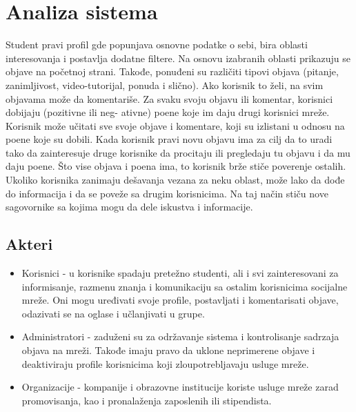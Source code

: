 \section{Analiza sistema}

Student pravi profil gde popunjava osnovne podatke o sebi, bira oblasti interesovanja i postavlja dodatne filtere. Na osnovu izabranih oblasti prikazuju se objave na početnoj strani. Takođe, ponuđeni
su različiti tipovi objava (pitanje, zanimljivost, video-tutorijal, ponuda i slično).
Ako korisnik to želi, na svim objavama može da komentariše.
Za svaku svoju objavu ili komentar, korisnici dobijaju (pozitivne ili neg-
ativne) poene koje im daju drugi korisnici mreže. Korisnik može
učitati sve svoje objave i komentare, koji su izlistani u odnosu na poene koje
su dobili. Kada korisnik pravi novu objavu ima za cilj da to uradi tako da
zainteresuje druge korisnike da procitaju ili pregledaju tu objavu i da mu
daju poene. Što vise objava i poena ima, to korisnik brže stiče poverenje
ostalih.
Ukoliko korisnika zanimaju dešavanja vezana za neku oblast, može lako da dođe do informacija i da se poveže sa drugim korisnicima. Na taj način stiču nove sagovornike sa kojima mogu da dele iskustva i informacije.

\subsection{Akteri}
\begin{itemize}
    \item Korisnici - u korisnike spadaju pretežno studenti, ali i svi zainteresovani za informisanje, razmenu znanja i komunikaciju sa ostalim korisnicima socijalne mreže. Oni mogu uređivati svoje profile, postavljati i komentarisati objave, odazivati se na oglase i učlanjivati u grupe.
    \item Administratori - zaduženi su za održavanje sistema i kontrolisanje sadrzaja objava na mreži. Takođe imaju pravo da uklone neprimerene objave i deaktiviraju profile korisnicima koji zloupotrebljavaju usluge mreže.
    \item Organizacije - kompanije i obrazovne institucije koriste usluge mreže zarad promovisanja, kao i  pronalaženja zaposlenih ili stipendista.
\end{itemize}

